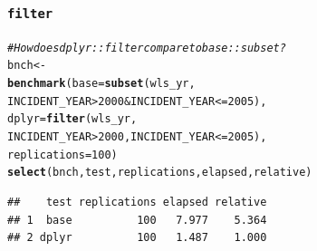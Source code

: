 \documentclass{beamer}\usepackage[]{graphicx}\usepackage[]{color}
\makeatletter
\newcommand{\hlnum}[1]{\textcolor[rgb]{0.686,0.059,0.569}{#1}}%
\newcommand{\hlcom}[1]{\textcolor[rgb]{0.678,0.584,0.686}{\textit{#1}}}%
\newcommand{\hlopt}[1]{\textcolor[rgb]{0,0,0}{#1}}%
\newcommand{\hlstd}[1]{\textcolor[rgb]{0.345,0.345,0.345}{#1}}%
\newcommand{\hlkwb}[1]{\textcolor[rgb]{0.69,0.353,0.396}{#1}}%
\newcommand{\hlkwc}[1]{\textcolor[rgb]{0.333,0.667,0.333}{#1}}%
\newcommand{\hlkwd}[1]{\textcolor[rgb]{0.737,0.353,0.396}{\textbf{#1}}}%
\newenvironment{kframe}{%
 \def\at@end@of@kframe{}%
 \ifinner\ifhmode%
  \def\at@end@of@kframe{\end{minipage}}%
  \begin{minipage}{\columnwidth}%
 \fi\fi%
 \def\FrameCommand##1{\hskip\@totalleftmargin \hskip-\fboxsep
 \colorbox{shadecolor}{##1}\hskip-\fboxsep
     \hskip-\linewidth \hskip-\@totalleftmargin \hskip\columnwidth}%
 \MakeFramed {\advance\hsize-\width
   \@totalleftmargin\z@ \linewidth\hsize
   \@setminipage}}%
 {\par\unskip\endMakeFramed%
 \at@end@of@kframe}
\newenvironment{knitrout}{}{} %
\makeatother
\begin{document}
\begin{frame}[fragile]
  \frametitle{{\tt filter}}

\begin{knitrout}\footnotesize
{}\color{fgcolor}\begin{kframe}
\begin{alltt}
\hlcom{# How does dplyr::filter compare to base::subset?}
\hlstd{bnch} \hlkwb{<-}
  \hlkwd{benchmark}\hlstd{(}\hlkwc{base} \hlstd{=} \hlkwd{subset}\hlstd{(wls_yr,}
                          \hlstd{INCIDENT_YEAR} \hlopt{>} \hlnum{2000} \hlopt{&} \hlstd{INCIDENT_YEAR} \hlopt{<=} \hlnum{2005}\hlstd{),}
            \hlkwc{dplyr} \hlstd{=} \hlkwd{filter}\hlstd{(wls_yr,}
                           \hlstd{INCIDENT_YEAR} \hlopt{>} \hlnum{2000}\hlstd{, INCIDENT_YEAR} \hlopt{<=} \hlnum{2005}\hlstd{),}
            \hlkwc{replications} \hlstd{=} \hlnum{100}\hlstd{)}
\hlkwd{select}\hlstd{(bnch, test, replications, elapsed, relative)}
\end{alltt}
\begin{verbatim}
##    test replications elapsed relative
## 1  base          100   7.977    5.364
## 2 dplyr          100   1.487    1.000
\end{verbatim}
\end{kframe}
\end{knitrout}
\end{frame} 
\end{document}
